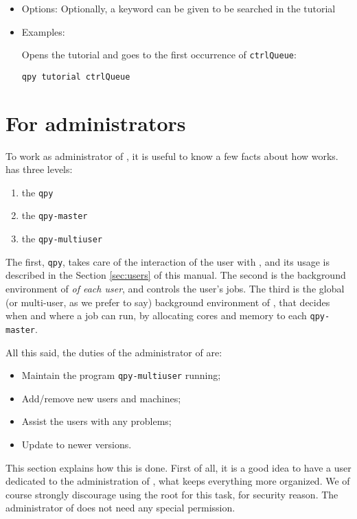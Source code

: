 \documentclass[a4paper,12pt]{article}
\begin{document}
\begin{itemize}
\item Options: Optionally, a keyword can be given to be searched in the tutorial

\item Examples:

  Opens the tutorial and goes to the first occurrence of \texttt{ctrlQueue}:
  
  \begin{lstlisting}[style=BashStyle]
    qpy tutorial ctrlQueue
  \end{lstlisting}

\end{itemize}

\newpage
\section{For administrators}

To work as administrator of \qpy{}, it is useful to know a few facts about how \qpy{} works.
\qpy{} has three levels:
\begin{enumerate}
\item the \texttt{qpy}
\item the \texttt{qpy-master}
\item the \texttt{qpy-multiuser}
\end{enumerate}
The first, \texttt{qpy}, takes care of the interaction of the user with \qpy{}, and its usage is described in the Section \ref{sec:users} of this manual.
The second is the background environment of \qpy{} \emph{of each user}, and controls the user's jobs.
The third is the global (or multi-user, as we prefer to say) background environment of \qpy{}, that decides when and where a job can run, by allocating cores and memory to each \texttt{qpy-master}.

All this said, the duties of the administrator of \qpy{} are:
\begin{itemize}
\item Maintain the program \texttt{qpy-multiuser} running;
\item Add/remove new users and machines;
\item Assist the users with any problems;
\item Update \qpy{} to newer versions.
\end{itemize}
This section explains how this is done.
First of all, it is a good idea to have a user dedicated to the administration of \qpy{}, what keeps everything more organized.
We of course strongly discourage using the root for this task, for security reason.
The administrator of \qpy{} does not need any special permission.
\end{document}
